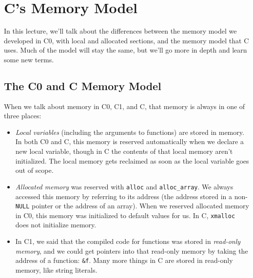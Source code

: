 \chapter{C's Memory Model}
\label{ch:mem}

\newcommand{\lecnum}{20}
\newcommand{\lecturer}{Frank Pfenning, Rob Simmons}

\maketitle

\begin{preamble}
  \noindent
  In this lecture, we'll talk about the differences between the memory
  model we developed in C0, with local and allocated sections, and the
  memory model that C uses. Much of the model will stay the same, but
  we'll go more in depth and learn some new terms.
\end{preamble}


\section{The C0 and C Memory Model}
\label{sec:mem:memory_models}

When we talk about memory in C0, C1, and C, that memory is always in one
of three places:
\begin{itemize}
\item%
  \emph{Local variables} (including the arguments to functions) are stored in
  memory. In both C0 and C, this memory is reserved automatically when we
  declare a new local variable, though in C the contents of that local memory
  aren't initialized. The local memory gets reclaimed as soon as the local
  variable goes out of scope.
\item%
  \emph{Allocated memory} was reserved with \lstinline'alloc' and
  \lstinline'alloc_array'. We always accessed this memory by referring to its
  address (the address stored in a non-\lstinline'NULL' pointer or the address
  of an array). When we reserved allocated memory in C0, this memory was
  initialized to default values for us. In C, \lstinline'xmalloc' does not
  initialize memory.
\item%
  In C1, we said that the compiled code for functions was stored in
  \emph{read-only memory}, and we could get pointers into that read-only
  memory by taking the address of a function: \lstinline'&f'.  Many more
  things in C are stored in read-only memory, like string literals.
\end{itemize}

